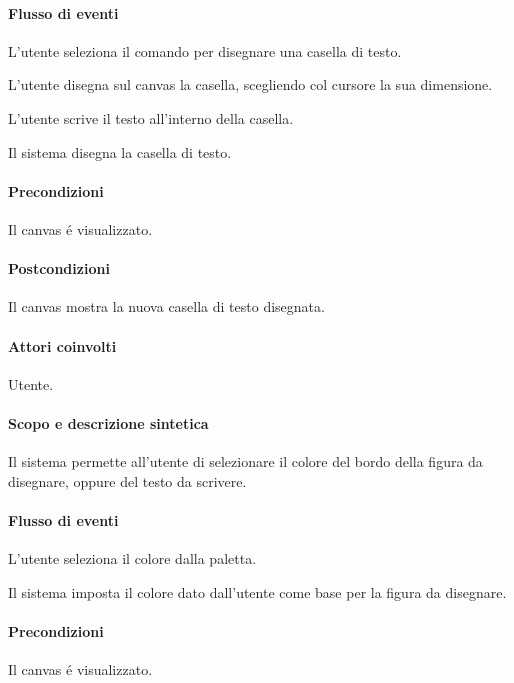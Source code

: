 \paragraph{Flusso di eventi}
\begin{elenconumerato}[\textbf{}]{\subsubsecindent}
\item L'utente seleziona il comando per disegnare una casella di testo.
\item L'utente disegna sul canvas la casella, scegliendo col cursore la sua dimensione.
\item L'utente scrive il testo all'interno della casella.
\item Il sistema disegna la casella di testo.
\end{elenconumerato}
\paragraph{Precondizioni} Il canvas \'e visualizzato.
\paragraph{Postcondizioni} Il canvas mostra la nuova casella di testo disegnata.

\paragraph{Attori coinvolti} Utente.
\paragraph{Scopo e descrizione sintetica} 
Il sistema permette all'utente di selezionare il colore del bordo della figura da disegnare, oppure del testo da scrivere.
\paragraph{Flusso di eventi}
\begin{elenconumerato}[\textbf{}]{\subsubsecindent}
\item L'utente seleziona il colore dalla paletta.
\item Il sistema imposta il colore dato dall'utente come base per la figura da disegnare.
\end{elenconumerato}
\paragraph{Precondizioni} Il canvas \'e visualizzato.
